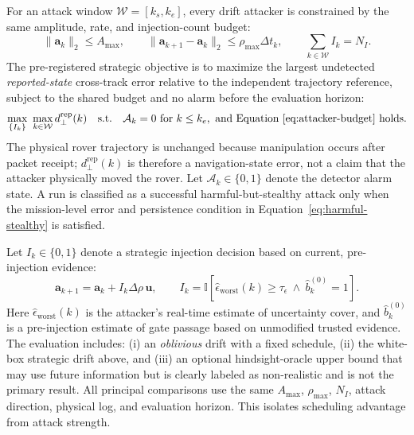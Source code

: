 \documentclass[11pt,a4paper]{article}
\begin{document}
For an attack window $\mathcal{W}=[k_s,k_e]$, every drift attacker is constrained by the same amplitude, rate, and injection-count budget:
\begin{equation}
\|\mathbf{a}_k\|_2\leq A_{\max},
\qquad
\|\mathbf{a}_{k+1}-\mathbf{a}_k\|_2\leq \rho_{\max}\Delta t_k,
\qquad
\sum_{k\in\mathcal{W}} I_k=N_I.
\label{eq:attacker-budget}
\end{equation}
The pre-registered strategic objective is to maximize the largest undetected \emph{reported-state} cross-track error relative to the independent trajectory reference, subject to the shared budget and no alarm before the evaluation horizon:
\begin{equation}
\max_{\{I_k\}}\ \max_{k\in\mathcal{W}} d^{\mathrm{rep}}_{\perp}(k)
\quad\text{s.t.}\quad
\mathcal{A}_k=0\ \text{for}\ k\leq k_e,\ \text{and Equation~\eqref{eq:attacker-budget} holds}.
\label{eq:attacker-objective}
\end{equation}
The physical rover trajectory is unchanged because manipulation occurs after packet receipt; $d^{\mathrm{rep}}_{\perp}(k)$ is therefore a navigation-state error, not a claim that the attacker physically moved the rover. Let $\mathcal{A}_k\in\{0,1\}$ denote the detector alarm state. A run is classified as a successful harmful-but-stealthy attack only when the mission-level error and persistence condition in Equation~\eqref{eq:harmful-stealthy} is satisfied.

Let $I_k\in\{0,1\}$ denote a strategic injection decision based on current, pre-injection evidence:
\begin{equation}
\mathbf{a}_{k+1}=\mathbf{a}_k+I_k\Delta\rho\,\mathbf{u},
\qquad
I_k=\mathbb{I}\!\left[\widehat{\epsilon}_{\mathrm{worst}}(k)\geq\tau_{\epsilon}\ \wedge\ \widehat{b}^{(0)}_k=1\right].
\label{eq:strategic-attack}
\end{equation}
Here $\widehat{\epsilon}_{\mathrm{worst}}(k)$ is the attacker's real-time estimate of uncertainty cover, and $\widehat{b}^{(0)}_k$ is a pre-injection estimate of gate passage based on unmodified trusted evidence. The evaluation includes: (i) an \emph{oblivious} drift with a fixed schedule, (ii) the white-box strategic drift above, and (iii) an optional hindsight-oracle upper bound that may use future information but is clearly labeled as non-realistic and is not the primary result. All principal comparisons use the same $A_{\max}$, $\rho_{\max}$, $N_I$, attack direction, physical log, and evaluation horizon. This isolates scheduling advantage from attack strength.
\end{document}
